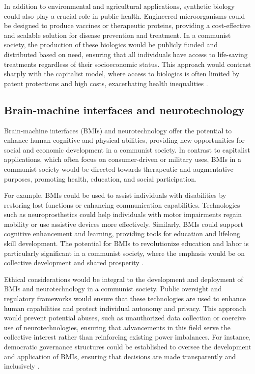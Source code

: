 In addition to environmental and agricultural applications, synthetic biology could also play a crucial role in public health. Engineered microorganisms could be designed to produce vaccines or therapeutic proteins, providing a cost-effective and scalable solution for disease prevention and treatment. In a communist society, the production of these biologics would be publicly funded and distributed based on need, ensuring that all individuals have access to life-saving treatments regardless of their socioeconomic status. This approach would contrast sharply with the capitalist model, where access to biologics is often limited by patent protections and high costs, exacerbating health inequalities \cite[pp.~500-505]{brown2022solidarity}.

\subsection{Brain-machine interfaces and neurotechnology}

Brain-machine interfaces (BMIs) and neurotechnology offer the potential to enhance human cognitive and physical abilities, providing new opportunities for social and economic development in a communist society. In contrast to capitalist applications, which often focus on consumer-driven or military uses, BMIs in a communist society would be directed towards therapeutic and augmentative purposes, promoting health, education, and social participation.

For example, BMIs could be used to assist individuals with disabilities by restoring lost functions or enhancing communication capabilities. Technologies such as neuroprosthetics could help individuals with motor impairments regain mobility or use assistive devices more effectively. Similarly, BMIs could support cognitive enhancement and learning, providing tools for education and lifelong skill development. The potential for BMIs to revolutionize education and labor is particularly significant in a communist society, where the emphasis would be on collective development and shared prosperity \cite[pp.~130-135]{rogers2018neurotechnology}.

Ethical considerations would be integral to the development and deployment of BMIs and neurotechnology in a communist society. Public oversight and regulatory frameworks would ensure that these technologies are used to enhance human capabilities and protect individual autonomy and privacy. This approach would prevent potential abuses, such as unauthorized data collection or coercive use of neurotechnologies, ensuring that advancements in this field serve the collective interest rather than reinforcing existing power imbalances. For instance, democratic governance structures could be established to oversee the development and application of BMIs, ensuring that decisions are made transparently and inclusively \cite[pp.~180-185]{diaz2018sustainability}.

